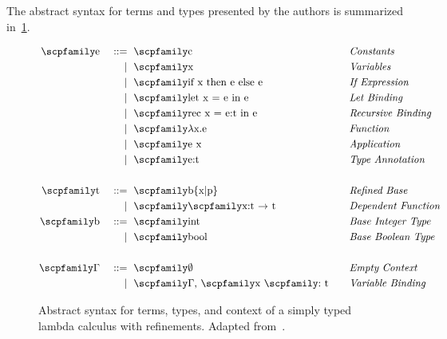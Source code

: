 \documentclass[
  oneside,
  english,
  coorientadorbanca,
  noabntexcite
]{ufsc-thesis-rn46-2019}
\def\bnfdef{::=}
\newcommand{\codett}[1]{\text{\scpfamily#1}}
\newcommand{\code}[1]{\text{\scpfamily\setlength\spaceskip{0.35em}#1}}
\newcommand{\bnfmore}[1]{            & \ & \mid{}    & \ \code{#1}}
\newcommand{\astprod}[2]{\code{#1} & \ & \bnfdef{} & \ \code{#2}}
\newcommand{\astmore}[1]{\bnfmore{#1}}
\newcommand{\typer}[2]{\code{#1 \codett{:} #2}}
\newcommand{\fnty}[2]{\code{#1 $\rightarrow$ #2}}
\begin{document}
The abstract syntax for terms and types presented by the authors is summarized in~\cref{fig:refinement_terms}.

\begin{figure}[ht]
  \begin{minipage}{\textwidth}
    \begin{alignat*}{4}
      \astprod{e}{c}                   & \quad & \textit{Constants}          \\
      \astmore{x}                      & \quad & \textit{Variables}          \\
      \astmore{if x then e else e}     & \quad & \textit{If Expression}      \\
      \astmore{let x = e in e}         & \quad & \textit{Let Binding}        \\
      \astmore{rec x = e:t in e}       & \quad & \textit{Recursive Binding}  \\
      \astmore{$\lambda$x.e}           & \quad & \textit{Function}           \\
      \astmore{e x}                    & \quad & \textit{Application}        \\
      \astmore{e:t}                    & \quad & \textit{Type Annotation}    \\
      \\
      \astprod{t}{b\{x|p\}}            & \quad & \textit{Refined Base}       \\
      \astmore{\fnty{x:t}{t}}          & \quad & \textit{Dependent Function} \\
      \astprod{b}{int}                 & \quad & \textit{Base Integer Type}  \\
      \astmore{bool}                   & \quad & \textit{Base Boolean Type}  \\
      \\
      \astprod{$\Gamma$}{$\emptyset$}  & \quad & \textit{Empty Context}      \\
      \astmore{$\Gamma$, \typer{x}{t}} & \quad & \textit{Variable Binding}   \\
    \end{alignat*}
  \end{minipage}
  \caption{
    Abstract syntax for terms, types, and context of a simply typed lambda calculus with refinements.
    Adapted from~\cite{jhala2020tutorial}.
  }\label{fig:refinement_terms}
\end{figure}
\end{document}
